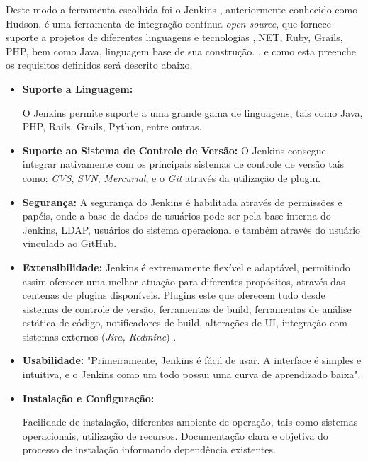 Deste modo a ferramenta escolhida foi o Jenkins , anteriormente conhecido como Hudson, é uma ferramenta de integração contínua \textit{open source}, que fornece suporte a projetos de diferentes linguagens e tecnologias ,.NET, Ruby, Grails, PHP, bem como Java, linguagem base de sua construção. \cite{smart2011}, e como esta preenche os requisitos definidos será descrito abaixo.

\begin{itemize}
\item {\textbf{Suporte a Linguagem:}}

O Jenkins permite suporte a uma grande gama de linguagens, tais como Java, PHP, Rails, Grails, Python, entre outras.

\item {\textbf{Suporte ao Sistema de Controle de Versão:}}
O Jenkins consegue integrar nativamente com os principais sistemas de controle de versão tais como: \textit{CVS}, \textit{SVN},  \textit{Mercurial}, e o \textit{Git} através da utilização de plugin.


\item {\textbf{Segurança:}}
A segurança do Jenkins é habilitada através de permissões e papéis, onde a base de dados de usuários pode ser pela base interna do Jenkins, LDAP, usuários do sistema operacional e também através do usuário vinculado ao GitHub.

\item {\textbf{Extensibilidade:}}
Jenkins é extremamente flexível e adaptável, permitindo assim oferecer uma melhor atuação para diferentes propósitos, através das centenas de plugins disponíveis. Plugins este que oferecem tudo desde sistemas de controle de versão, ferramentas de build, ferramentas de análise estática de código, notificadores de build, alterações de UI, integração com sistemas externos (\textit{Jira, Redmine}) \cite{smart2011}.


\item {\textbf{Usabilidade:}}
"Primeiramente, Jenkins é fácil de usar. A interface é simples e intuitiva, e o Jenkins como um todo possui uma curva de aprendizado baixa"\space \cite[p~.3]{smart2011}.

\item {\textbf{Instalação e Configuração:}}

Facilidade de instalação, diferentes ambiente de operação, tais como sistemas operacionais, utilização de recursos. Documentação clara e objetiva do processo de instalação informando dependência existentes.

\end{itemize}

